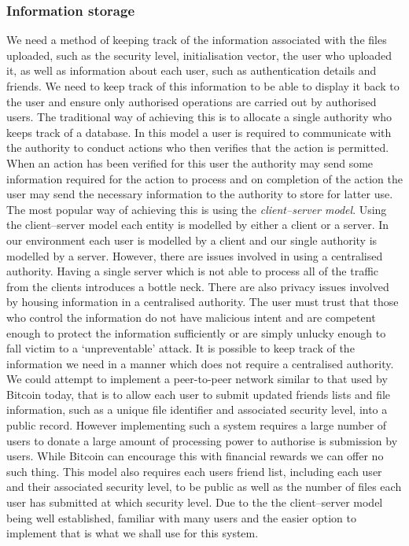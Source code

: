 \documentclass[12pt, titlepage]{article}
\begin{document}
\subsubsection{Information storage}
We need a method of keeping track of the information associated with the files uploaded, such as the security level, initialisation vector, the user who uploaded it, as well as information about each user, such as authentication details and friends. We need to keep track of this information to be able to display it back to the user and ensure only authorised operations are carried out by authorised users.
\newline \indent The traditional way of achieving this is to allocate a single authority who keeps track of a database. In this model a user is required to communicate with the authority to conduct actions who then verifies that the action is permitted. When an action has been verified for this user the authority may send some information required for the action to process and on completion of the action the user may send the necessary information to the authority to store for latter use. The most popular way of achieving this is using the \textit{client–server model}. Using the client–server model each entity is modelled by either a client or a server. In our environment each user is modelled by a client and our single authority is modelled by a server. However, there are issues involved in using a centralised authority. Having a single server which is not able to process all of the traffic from the clients introduces a bottle neck. There are also privacy issues involved by housing information in a centralised authority. The user must trust that those who control the information do not have malicious intent and are competent enough to protect the information sufficiently or are simply unlucky enough to fall victim to a `unpreventable' attack.  
\newline \indent It is possible to keep track of the information we need in a manner which does not require a centralised authority. We could attempt to implement a peer-to-peer network similar to that used by Bitcoin today, that is to allow each user to submit updated friends lists and file information, such as a unique file identifier and associated security level, into a public record. However implementing such a system requires a large number of users to donate a large amount of processing power to authorise is submission by users. While Bitcoin can encourage this with financial rewards we can offer no such thing. This model also requires each users friend list, including each user and their associated security level, to be public as well as the number of files each user has submitted at which security level.
\newline \indent Due to the the client–server model being well established, familiar with many users and the easier option to implement that is what we shall use for this system.
\end{document}
